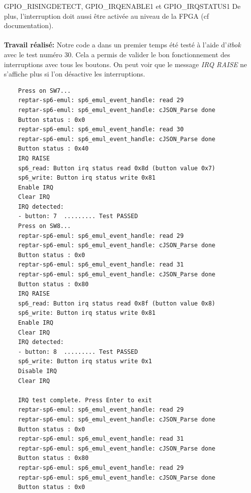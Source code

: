 GPIO\_RISINGDETECT, GPIO\_IRQENABLE1 et GPIO\_IRQSTATUS1
De plus, l'interruption doit aussi être activée au niveau de la FPGA (cf documentation). \\\\
\textbf{Travail réalisé: }Notre code a dans un premier temps été testé à l'aide d'\textit{itbok} avec le test numéro 30. Cela a permis de valider le bon fonctionnement des interruptions avec tous les boutons. On peut voir que le message \textit{IRQ RAISE} ne s'affiche plus si l'on désactive les interruptions.
\begin{lstlisting}
	Press on SW7...
	reptar-sp6-emul: sp6_emul_event_handle: read 29 
	reptar-sp6-emul: sp6_emul_event_handle: cJSON_Parse done 
	Button status : 0x0
	reptar-sp6-emul: sp6_emul_event_handle: read 30 
	reptar-sp6-emul: sp6_emul_event_handle: cJSON_Parse done 
	Button status : 0x40
	IRQ RAISE
	sp6_read: Button irq status read 0x8d (button value 0x7)
	sp6_write: Button irq status write 0x81
	Enable IRQ
	Clear IRQ
	IRQ detected:
	- button: 7  ......... Test PASSED
	Press on SW8...
	reptar-sp6-emul: sp6_emul_event_handle: read 29 
	reptar-sp6-emul: sp6_emul_event_handle: cJSON_Parse done 
	Button status : 0x0
	reptar-sp6-emul: sp6_emul_event_handle: read 31 
	reptar-sp6-emul: sp6_emul_event_handle: cJSON_Parse done 
	Button status : 0x80
	IRQ RAISE
	sp6_read: Button irq status read 0x8f (button value 0x8)
	sp6_write: Button irq status write 0x81
	Enable IRQ
	Clear IRQ
	IRQ detected:
	- button: 8  ......... Test PASSED
	sp6_write: Button irq status write 0x1
	Disable IRQ
	Clear IRQ
	
	IRQ test complete. Press Enter to exit
	reptar-sp6-emul: sp6_emul_event_handle: read 29 
	reptar-sp6-emul: sp6_emul_event_handle: cJSON_Parse done 
	Button status : 0x0
	reptar-sp6-emul: sp6_emul_event_handle: read 31 
	reptar-sp6-emul: sp6_emul_event_handle: cJSON_Parse done 
	Button status : 0x80
	reptar-sp6-emul: sp6_emul_event_handle: read 29 
	reptar-sp6-emul: sp6_emul_event_handle: cJSON_Parse done 
	Button status : 0x0
\end{lstlisting}
